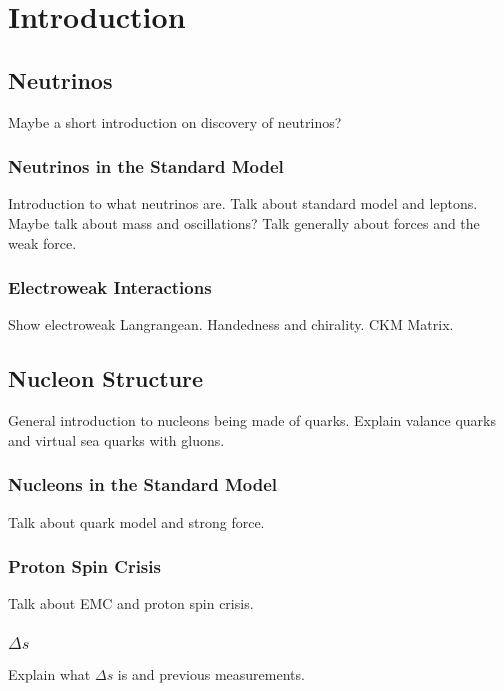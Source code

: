 \section{Introduction} \label{intro}
\hspace{\parindent}

\subsection{Neutrinos}\label{nutheory}
  Maybe a short introduction on discovery of neutrinos?
  \subsubsection{Neutrinos in the Standard Model}
    Introduction to what neutrinos are. Talk about standard model and leptons.
    Maybe talk about mass and oscillations? Talk generally about forces and the
    weak force.
  \subsubsection{Electroweak Interactions}
    Show electroweak Langrangean. Handedness and chirality. CKM Matrix.

\subsection{Nucleon Structure}\label{nucleon}
  General introduction to nucleons being made of quarks. Explain valance quarks
  and virtual sea quarks with gluons.
  \subsubsection{Nucleons in the Standard Model}
    Talk about quark model and strong force.
  \subsubsection{Proton Spin Crisis}
    Talk about EMC and proton spin crisis. 
  \subsubsection{$\Delta s$}
    Explain what $\Delta s$ is and previous measurements.

